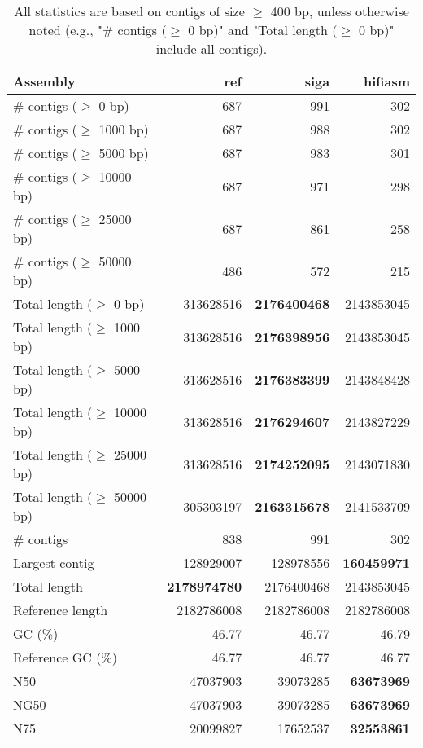 \documentclass[12pt,a4paper]{article}
\begin{document}
\begin{table}[ht]
\begin{center}
\caption{All statistics are based on contigs of size $\geq$ 400 bp, unless otherwise noted (e.g., "\# contigs ($\geq$ 0 bp)" and "Total length ($\geq$ 0 bp)" include all contigs).}
\begin{tabular}{|l*{3}{|r}|}
\hline
Assembly & ref & siga & hifiasm \\ \hline
\# contigs ($\geq$ 0 bp) & 687 & 991 & 302 \\ \hline
\# contigs ($\geq$ 1000 bp) & 687 & 988 & 302 \\ \hline
\# contigs ($\geq$ 5000 bp) & 687 & 983 & 301 \\ \hline
\# contigs ($\geq$ 10000 bp) & 687 & 971 & 298 \\ \hline
\# contigs ($\geq$ 25000 bp) & 687 & 861 & 258 \\ \hline
\# contigs ($\geq$ 50000 bp) & 486 & 572 & 215 \\ \hline
Total length ($\geq$ 0 bp) & 313628516 & {\bf 2176400468} & 2143853045 \\ \hline
Total length ($\geq$ 1000 bp) & 313628516 & {\bf 2176398956} & 2143853045 \\ \hline
Total length ($\geq$ 5000 bp) & 313628516 & {\bf 2176383399} & 2143848428 \\ \hline
Total length ($\geq$ 10000 bp) & 313628516 & {\bf 2176294607} & 2143827229 \\ \hline
Total length ($\geq$ 25000 bp) & 313628516 & {\bf 2174252095} & 2143071830 \\ \hline
Total length ($\geq$ 50000 bp) & 305303197 & {\bf 2163315678} & 2141533709 \\ \hline
\# contigs & 838 & 991 & 302 \\ \hline
Largest contig & 128929007 & 128978556 & {\bf 160459971} \\ \hline
Total length & {\bf 2178974780} & 2176400468 & 2143853045 \\ \hline
Reference length & 2182786008 & 2182786008 & 2182786008 \\ \hline
GC (\%) & 46.77 & 46.77 & 46.79 \\ \hline
Reference GC (\%) & 46.77 & 46.77 & 46.77 \\ \hline
N50 & 47037903 & 39073285 & {\bf 63673969} \\ \hline
NG50 & 47037903 & 39073285 & {\bf 63673969} \\ \hline
N75 & 20099827 & 17652537 & {\bf 32553861} \\ \hline

\end{tabular}
\end{center}
\end{table}
\end{document}
